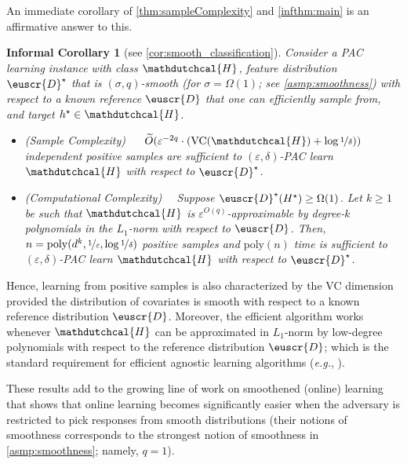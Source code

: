 \documentclass[11pt]{article}
\theoremstyle{plain}
\newtheorem{infcorollary}[theorem]{Informal Corollary}
\theoremstyle{definition}
\theoremstyle{remark}
\newcommand{\sinparen}[1]{(#1)}
\newcommand{\inparen}[1]{\left(#1\right)}
\newcommand{\nfrac}[2]{\nicefrac{#1}{#2}}
\newcommand{\poly}{\mathrm{poly}}
\newcommand{\vc}{\textrm{\rm VC}}
\newcommand{\eps}{\varepsilon}
\newcommand{\wt}[1]{\widetilde{#1}}
\newcommand{\customcal}[1]{\euscr{#1}}
\newcommand{\cD}{\customcal{D}}
\newcommand{\eg}{\textit{e.g.}}
\newcommand{\hypo}[1]{\mathdutchcal{#1}}
\newcommand{\hyH}{\hypo{H}}
\newcommand{\optset}{{H^\star}}
\newcommand{\cDtrue}{\cD^\star}
\newcommand{\cDgiven}{\cD}
\newcommand{\nL}{L}
\begin{document}
\noindent An immediate corollary of \cref{thm:sampleComplexity} and \cref{infthm:main} is  an affirmative answer to this. %
\begin{infcorollary}[see \cref{cor:smooth_classification}]\label{infcor:smooth_classification}\label{infcor:smooth}
    Consider a PAC learning instance with class $\hyH$, feature distribution $\cDtrue$ that is $(\sigma,q)$-smooth (for $\sigma=\Omega(1)$; see \cref{asmp:smoothness}) with respect to a known reference $\cD$ that one can efficiently sample from, and target $h^\star\in \hyH$.  
    \begin{itemize}
        \item[$\triangleright$] \textit{(Sample Complexity)} ~~
            $\wt{O}\sinparen{{\eps^{-2q}}\cdot \inparen{\vc{}(\hyH) + \log{\nfrac{1}{\delta}}}}$ independent positive samples are sufficient to $(\eps,\delta)$-PAC learn $\hyH$ with respect to $\cDtrue$.
        \item[$\triangleright$] \textit{(Computational Complexity)}~~
            Suppose $\cDtrue(\optset)\geq \Omega(1)$.
            Let $k\geq 1$ be such that $\hyH$ is $\eps^{O(q)}$-approximable by degree-$k$ polynomials in the $\nL_1$-norm with respect to $\cD$.
            Then, $n=\poly(d^k,\nfrac{1}{\eps},\log{\nfrac{1}{\delta}})$ positive samples and $\poly(n)$ time is sufficient to $(\eps,\delta)$-PAC learn $\hyH$ with respect to $\cDtrue$.
    \end{itemize}
\end{infcorollary}
Hence, learning from positive samples is also characterized by the VC dimension provided the distribution of covariates is smooth with respect to a known reference distribution $\cDgiven$. Moreover, the efficient algorithm works whenever $\hyH$ can be approximated in $\nL_1$-norm by low-degree polynomials with respect to the reference distribution $\cDgiven$; which is the standard requirement for efficient agnostic learning algorithms (\eg{}, \cite{kalai2008agnostically,pmlr-v247-chandrasekaran24a}).

    

    These results add to the growing line of work on smoothened (online) learning \cite{haghtalab2022efficientSmooth,haghtalab2020smooth,haghtalab2024smoothJACM,block2024performanceempiricalriskminimization} that shows that online learning becomes significantly easier when the adversary is restricted to pick responses from smooth distributions (their notions of smoothness corresponds to the strongest notion of smoothness in \cref{asmp:smoothness}; namely, $q=1$).
    
\end{document}
